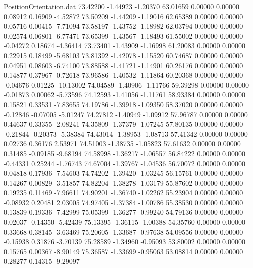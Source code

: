 \begin{filecontents}{PositionOrientation.dat}
  73.42200   -1.44923   -1.20370    63.01659    0.00000    0.00000    0.08912    0.16909   -4.52872
  73.50209   -1.44209   -1.19016    62.65389    0.00000    0.00000    0.05716    0.00415   -7.71094
  73.58197   -1.43752   -1.18982    62.03794    0.00000    0.00000    0.02574    0.06801   -6.77471
  73.65399   -1.43567   -1.18493    61.55002    0.00000    0.00000   -0.04272    0.18674   -4.36414
  73.73401   -1.43909   -1.16998    61.20083    0.00000    0.00000    0.22915    0.18499   -5.68103
  73.81392   -1.42078   -1.15520    60.74687    0.00000    0.00000    0.04951    0.08603   -6.74100
  73.88588   -1.41721   -1.14901    60.26176    0.00000    0.00000    0.14877    0.37967   -0.72618
  73.96586   -1.40532   -1.11864    60.20368    0.00000    0.00000   -0.04676    0.01225  -10.13002
  74.04589   -1.40906   -1.11766    59.39298    0.00000    0.00000   -0.01873    0.00062   -5.73596
  74.12593   -1.41056   -1.11761    58.93384    0.00000    0.00000    0.15821    0.33531   -7.83655
  74.19786   -1.39918   -1.09350    58.37020    0.00000    0.00000   -0.12846   -0.07005   -5.01247
  74.27812   -1.40949   -1.09912    57.96787    0.00000    0.00000    0.44637    0.33355   -2.08241
  74.35809   -1.37379   -1.07245    57.80135    0.00000    0.00000   -0.21844   -0.20373   -5.38384
  74.43014   -1.38953   -1.08713    57.41342    0.00000    0.00000    0.02736    0.36176    2.53971
  74.51003   -1.38735   -1.05823    57.61632    0.00000    0.00000    0.31485   -0.09185   -9.68194
  74.58998   -1.36217   -1.06557    56.84222    0.00000    0.00000   -0.44331    0.25244   -1.76743
  74.67004   -1.39767   -1.04536    56.70072    0.00000    0.00000    0.04818    0.17936   -7.54603
  74.74202   -1.39420   -1.03245    56.15761    0.00000    0.00000    0.14267    0.00829   -3.51857
  74.82204   -1.38278   -1.03179    55.87602    0.00000    0.00000    0.19235    0.11469   -7.96611
  74.90201   -1.36740   -1.02262    55.23904    0.00000    0.00000   -0.08932    0.20481    2.03005
  74.97405   -1.37384   -1.00786    55.38530    0.00000    0.00000    0.13839    0.19336   -7.42999
  75.05399   -1.36277   -0.99240    54.79136    0.00000    0.00000    0.02037   -0.14350   -5.42439
  75.13395   -1.36115   -1.00388    54.35760    0.00000    0.00000    0.33668    0.38145   -3.63469
  75.20605   -1.33687   -0.97638    54.09556    0.00000    0.00000   -0.15938    0.31876   -3.70139
  75.28589   -1.34960   -0.95093    53.80002    0.00000    0.00000    0.15765    0.00367   -8.90149
  75.36587   -1.33699   -0.95063    53.08814    0.00000    0.00000    0.28277    0.14315   -9.29097

\end{filecontents}
